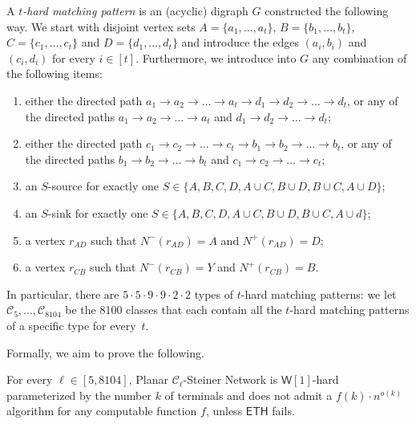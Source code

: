 \begingroup
\def\thetheorem{\ref{def:cleanedorderedtoughpair}}
\begin{definition}
A \emph{$t$-hard matching pattern} is
an (acyclic) digraph $G$ constructed the following way. We start with disjoint vertex sets $A= \{a_1,\ldots,a_t\}$, $B = \{b_1,\ldots,b_t\}$, $C = \{c_1,\ldots,c_t\}$ and $D = \{d_1,\ldots,d_t\}$ and introduce the edges $(a_i,b_i)$ and $(c_i,d_i)$ for every $i\in[t]$.
Furthermore, we introduce into $G$ any combination of the following items:
\begin{enumerate}
\item either the directed path $a_1 \rightarrow a_2 \rightarrow \ldots \rightarrow a_t \rightarrow d_1 \rightarrow d_2 \rightarrow \ldots \rightarrow d_t$, or any of the directed paths $a_1 \rightarrow a_2 \rightarrow \ldots \rightarrow a_t$ and 
$d_1 \rightarrow d_2 \rightarrow \ldots \rightarrow d_t$;
\item either the directed path $c_1 \rightarrow c_2 \rightarrow \ldots \rightarrow c_t \rightarrow b_1 \rightarrow b_2 \rightarrow \ldots \rightarrow b_t$, or any of the directed paths $b_1 \rightarrow b_2 \rightarrow \ldots \rightarrow b_t$ and $c_1 \rightarrow c_2 \rightarrow \ldots \rightarrow c_t$;
\item an $S$-source for exactly one $S \in \{A,B,C,D,A \cup C,B \cup D,B \cup C,A \cup D\}$;
\item an $S$-sink for exactly one $S \in \{A,B,C,D,A \cup C,B \cup D,B \cup C,A \cup d\}$;
\item a vertex $r_{AD}$ such that $N^-(r_{AD}) = A$ and $N^+(r_{AD}) = D$;
\item a vertex $r_{CB}$ such that $N^-(r_{CB}) = Y$ and $N^+(r_{CB}) = B$.
\end{enumerate}
In particular, there are $5 \cdot 5 \cdot 9 \cdot 9 \cdot 2 \cdot 2$ types of $t$-hard matching patterns: we let $\mathcal{C}_5, \ldots, \mathcal{C}_{8104}$ be the 8100 classes that each contain all the $t$-hard matching patterns of a specific type for every~$t$.
\end{definition}
\addtocounter{theorem}{-1}
\endgroup

Formally, we aim to prove the following.

\begin{lemma}
\label{lem:cleanedtoughpair}
For every $\ell \in [5,8104]$, 
{\sc Planar $\mathcal{C}_\ell$-Steiner Network} is $\mathsf{W}[1]$-hard parameterized by the number $k$ of terminals and does not admit a $f(k) \cdot n^{o(k)}$ algorithm for any computable function $f$,
unless $\mathsf{ETH}$ fails.
\end{lemma}

